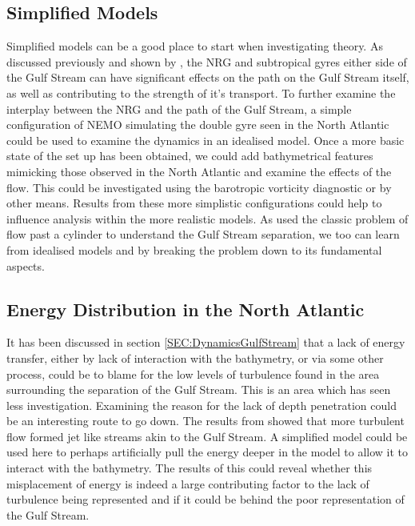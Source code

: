 \documentclass[..\report.tex]{subfiles}
\begin{document}
\subsection{Simplified Models}
\label{SSEC:SimplifiedModels}

Simplified models can be a good place to start when investigating theory.  
As discussed previously and shown by \citet{Zhang2007}, the \gls{NRG} and subtropical gyres either side of the Gulf Stream can have significant effects on the path on the Gulf Stream itself, as well as contributing to the strength of it's transport.
To further examine the interplay between the \gls{NRG} and the path of the Gulf Stream, a simple configuration of \gls{NEMO} simulating the double gyre seen in the North Atlantic could be used to examine the dynamics in an idealised model.
Once a more basic state of the set up has been obtained, we could add bathymetrical features mimicking those observed in the North Atlantic and examine the effects of the flow.
This could be investigated using the barotropic vorticity diagnostic or by other means.
Results from these more simplistic configurations could help to influence analysis within the more realistic models. 
As \citet{Tansley2001} used the classic problem of flow past a cylinder to understand the Gulf Stream separation, we too can learn from idealised models and by breaking the problem down to its fundamental aspects.

\subsection{Energy Distribution in the North Atlantic}
\label{SSEC:EnergyDistribution}
  
It has been discussed in section \ref{SEC:DynamicsGulfStream} that a lack of energy transfer, either by lack of interaction with the bathymetry, or via some other process, could be to blame for the low levels of turbulence found in the area surrounding the separation of the Gulf Stream. This is an area which has seen less investigation. Examining the reason for the lack of depth penetration could be an interesting route to go down.
The results from \citet{Tansley2001} showed that more turbulent flow formed jet like streams akin to the Gulf Stream. 
A simplified model could be used here to perhaps artificially pull the energy deeper in the model to allow it to interact with the bathymetry.
The results of this could reveal whether this misplacement of energy is indeed a large contributing factor to the lack of turbulence being represented and if it could be behind the poor representation of the Gulf Stream.
\end{document}
